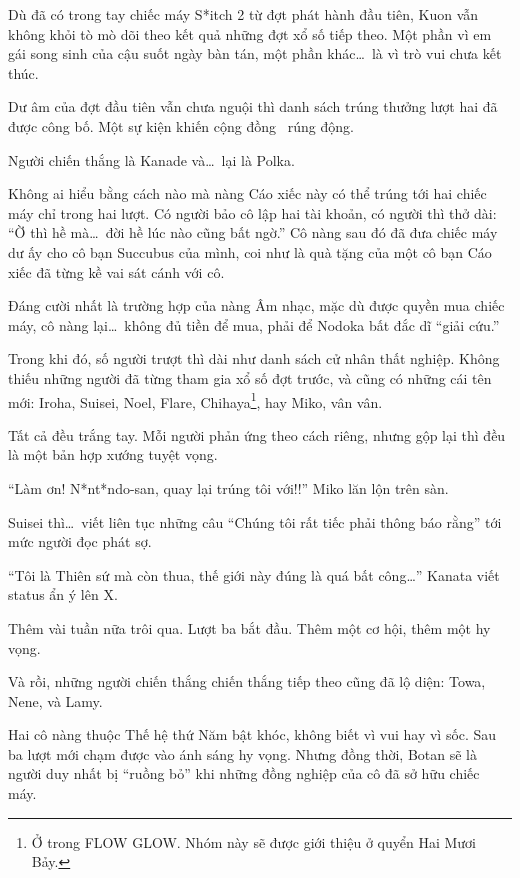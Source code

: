 \documentclass[../main.tex]{subfiles}
\begin{document}
\ct

Dù đã có trong tay chiếc máy S*itch 2 từ đợt phát hành đầu tiên, Kuon vẫn không khỏi tò mò dõi theo kết quả những đợt xổ số tiếp theo. Một phần vì em gái song sinh của cậu suốt ngày bàn tán, một phần khác\dots\ là vì trò vui chưa kết thúc.

Dư âm của đợt đầu tiên vẫn chưa nguội thì danh sách trúng thưởng lượt hai đã được công bố. Một sự kiện khiến cộng đồng \hll\ rúng động.

Người chiến thắng là Kanade và\dots\ lại là Polka.

Không ai hiểu bằng cách nào mà nàng Cáo xiếc này có thể trúng tới hai chiếc máy chỉ trong hai lượt. Có người bảo cô lập hai tài khoản, có người thì thở dài: ``Ờ thì hề mà\dots\ đời hề lúc nào cũng bất ngờ.'' Cô nàng sau đó đã đưa chiếc máy dư ấy cho cô bạn Succubus của mình, coi như là quà tặng của một cô bạn Cáo xiếc đã từng kề vai sát cánh với cô.

Đáng cười nhất là trường hợp của nàng Âm nhạc, mặc dù được quyền mua chiếc máy, cô nàng lại\dots\ không đủ tiền để mua, phải để Nodoka bất đắc dĩ ``giải cứu.''

Trong khi đó, số người trượt thì dài như danh sách cử nhân thất nghiệp. Không thiếu những người đã từng tham gia xổ số đợt trước, và cũng có những cái tên mới: Iroha, Suisei, Noel, Flare, Chihaya\footnote{Ở trong FLOW GLOW. Nhóm này sẽ được giới thiệu ở quyển Hai Mươi Bảy.}, hay Miko, vân vân.

Tất cả đều trắng tay. Mỗi người phản ứng theo cách riêng, nhưng gộp lại thì đều là một bản hợp xướng tuyệt vọng.

``Làm ơn! N*nt*ndo-san, quay lại trúng tôi với!!'' Miko lăn lộn trên sàn.

Suisei thì\dots\ viết liên tục những câu ``Chúng tôi rất tiếc phải thông báo rằng'' tới mức người đọc phát sợ.

``Tôi là Thiên sứ mà còn thua, thế giới này đúng là quá bất công\dots'' Kanata viết status ẩn ý lên X.

\ct

Thêm vài tuần nữa trôi qua. Lượt ba bắt đầu. Thêm một cơ hội, thêm một hy vọng.

Và rồi, những người chiến thắng chiến thắng tiếp theo cũng đã lộ diện: Towa, Nene, và Lamy.

Hai cô nàng thuộc Thế hệ thứ Năm bật khóc, không biết vì vui hay vì sốc. Sau ba lượt mới chạm được vào ánh sáng hy vọng. Nhưng đồng thời, Botan sẽ là người duy nhất bị ``ruồng bỏ'' khi những đồng nghiệp của cô đã sở hữu chiếc máy.
\end{document}
